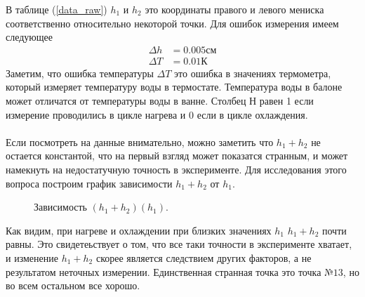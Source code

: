 \documentclass[a4paper, 12pt]{article}
\begin{document}
    В таблице (\ref{data_raw}) $h_1$ и $h_2$ это координаты правого и левого мениска соответственно относительно некоторой точки. Для ошибок измерения имеем следующее
    \begin{align*}
        \Delta h &= 0.005см\\
        \Delta T &= 0.01К
    \end{align*}
    Заметим, что ошибка температуры $\Delta T$ это ошибка в значениях термометра, который измеряет температуру воды в термостате. Температура воды в балоне может отличатся от температуры воды в ванне. Столбец Н равен 1 если измерение проводились в цикле нагрева и 0 если в цикле охлаждения.
    \paragraph{}
    Если посмотреть на данные внимательно, можно заметить что $h_1 + h_2$ не остается константой, что на первый взгляд может показатся странным, и может намекнуть на недостатучную точность в эксперименте. Для исследования этого вопроса построим график зависимости $h_1+h_2$ от $h_1$.

    \begin{figure}[h]
        \caption{Зависимость $(h_1+h_2)(h_1)$.}
        \label{H(h)}
    \end{figure}
    Как видим, при нагреве и охлаждении при близких значениях $h_1$ $h_1 + h_2$ почти равны. Это свидетеьствует о том, что все таки точности в эксперименте хватает, и изменение $h_1+h_2$ скорее является следствием других факторов, а не результатом неточных измерении. Единственная странная точка это точка $№ 13$, но во всем остальном все хорошо.
\end{document}
